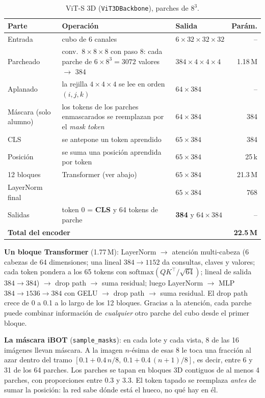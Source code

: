 \documentclass[11pt,a4paper]{article}
\begin{document}
\begin{table}[H]
\centering
\small
\begin{tabularx}{\textwidth}{l>{\raggedright\arraybackslash}Xlr}
\toprule
Parte & Operación & Salida & Parám. \\
\midrule
Entrada & cubo de 6 canales & $6\times32\times32\times32$ & -- \\
Parcheado & conv.\ $8\times8\times8$ con paso 8: cada parche de $6\times8^3 = 3072$ valores $\rightarrow$ 384 & $384\times4\times4\times4$ & 1.18\,M \\
Aplanado & la rejilla $4\times4\times4$ se lee en orden $(i,j,k)$ & $64\times384$ & -- \\
Máscara (solo alumno) & los tokens de los parches enmascarados se reemplazan por el \emph{mask token} & $64\times384$ & 384 \\
CLS & se antepone un token aprendido & $65\times384$ & 384 \\
Posición & se suma una posición aprendida por token & $65\times384$ & 25\,k \\
12 bloques & Transformer (ver abajo) & $65\times384$ & 21.3\,M \\
LayerNorm final & & $65\times384$ & 768 \\
Salidas & token 0 = \textbf{CLS} y 64 tokens de parche & \textbf{384} y $64\times384$ & -- \\
\midrule
\multicolumn{3}{l}{\textbf{Total del encoder}} & \textbf{22.5\,M} \\
\bottomrule
\end{tabularx}
\caption{ViT-S 3D (\texttt{ViT3DBackbone}), parches de $8^3$.}
\end{table}

\textbf{Un bloque Transformer} (1.77\,M): LayerNorm $\rightarrow$ atención multi-cabeza (6 cabezas de
64 dimensiones; una lineal $384\rightarrow1152$ da consultas, claves y valores; cada token pondera a
los 65 tokens con $\mathrm{softmax}(QK^\top/\sqrt{64})$; lineal de salida $384\rightarrow384$)
$\rightarrow$ drop path $\rightarrow$ suma residual; luego LayerNorm $\rightarrow$ MLP
$384\rightarrow1536\rightarrow384$ con GELU $\rightarrow$ drop path $\rightarrow$ suma residual. El
drop path crece de 0 a 0.1 a lo largo de los 12 bloques. Gracias a la atención, cada parche puede
combinar información de \emph{cualquier} otro parche del cubo desde el primer bloque.

\textbf{La máscara iBOT} (\texttt{sample\_masks}): en cada lote y cada vista, 8 de las 16 imágenes
llevan máscara. A la imagen $n$-ésima de esas 8 le toca una fracción al azar dentro del tramo
$[0.1+0.4\,n/8,\ 0.1+0.4\,(n+1)/8]$, es decir, entre 6 y 31 de los 64 parches. Los parches se tapan
en bloques 3D contiguos de al menos 4 parches, con proporciones entre 0.3 y 3.3. El token tapado se
reemplaza \emph{antes} de sumar la posición: la red sabe dónde está el hueco, no qué hay en él.
\end{document}
